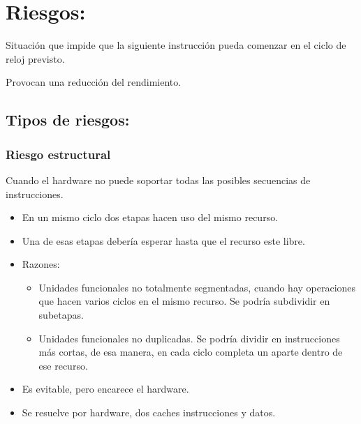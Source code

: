 \documentclass[12pt, twoside, openright]{report} %
\begin{document}
  \section{Riesgos:}

Situación que impide que la siguiente instrucción pueda comenzar en el
ciclo de reloj previsto.

Provocan una reducción del rendimiento.

\subsection{Tipos de riesgos:}
\subsubsection{Riesgo estructural} Cuando el hardware no puede soportar todas las posibles secuencias de instrucciones.
    \begin{itemize}
      \item En un mismo ciclo dos etapas hacen uso del mismo recurso.
      \item Una de esas etapas debería esperar hasta que el recurso este libre.
      \item Razones:
          \begin{itemize}
            \item Unidades funcionales no totalmente segmentadas, cuando hay operaciones que hacen varios ciclos en el mismo recurso. Se podría subdividir en subetapas.
            \item Unidades funcionales no duplicadas. Se podría dividir en instrucciones más cortas, de esa manera, en cada ciclo completa un aparte dentro de ese recurso.
          \end{itemize}
   
      \item Es evitable, pero encarece el hardware.
      \item Se resuelve por hardware, dos caches instrucciones y datos.
    \end{itemize}
    
\end{document}
